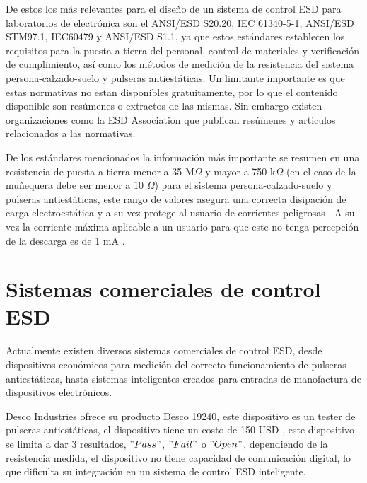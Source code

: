         De estos los más relevantes para el diseño de un sistema de control ESD para laboratorios de electrónica 
        son el ANSI/ESD S20.20, IEC 61340-5-1, ANSI/ESD STM97.1, IEC60479 y ANSI/ESD S1.1, 
        ya que estos estándares establecen los requisitos para la puesta a tierra del personal, 
        control de materiales y verificación de cumplimiento, así como los métodos de medición de 
        la resistencia del sistema persona-calzado-suelo y pulseras antiestáticas. Un limitante 
        importante es que estas normativas no estan disponibles gratuitamente, 
        por lo que el contenido disponible son resúmenes o extractos de las mismas. Sin embargo existen
        organizaciones como la ESD Association que publican resúmenes y articulos relacionados a las normativas.
        \vspace{2mm}

        De los estándares mencionados la información más importante se resumen en una resistencia de 
        puesta a tierra menor a 35 M$\Omega$ y mayor a 750 k$\Omega$ (en el caso de la muñequera debe
        ser menor a 10 $\Omega$) para el sistema persona-calzado-suelo 
        y pulseras antiestáticas, este rango de valores asegura una correcta disipación de carga
        electroestática y a su vez protege al usuario de corrientes peligrosas \cite{IEC61340_Preview}. A su vez
        la corriente máxima aplicable a un usuario para que este no tenga percepción de la descarga es de 1 mA \cite{IEC60479}.
        

    \section{Sistemas comerciales de control ESD}

        Actualmente existen diversos sistemas comerciales de control ESD, desde dispositivos económicos para medición del
        correcto funcionamiento de pulseras antiestáticas, hasta sistemas inteligentes creados para entradas de manofactura
        de dispositivos electrónicos. 

        Desco Industries ofrece su producto Desco 19240, este dispositivo es un tester de pulseras antiestáticas, 
        el dispositivo tiene un costo de 150 USD \cite{Desco_19240}, este dispositivo se limita a dar 3 resultados, 
        $"Pass"$, $"Fail"$ o $"Open"$, dependiendo de la resistencia medida, 
        el dispositivo no tiene capacidad de comunicación digital, 
        lo que dificulta su integración en un sistema de control ESD inteligente.

